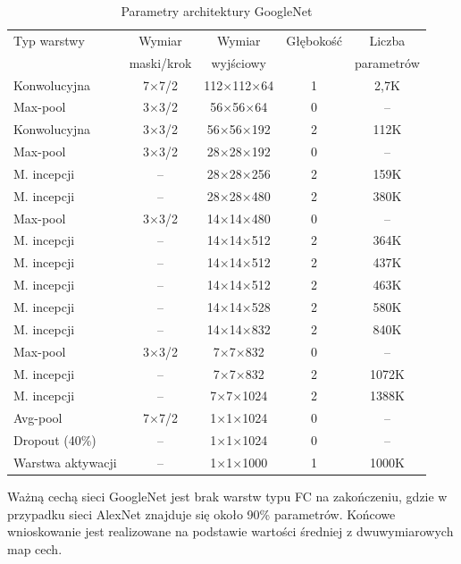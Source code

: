 \begin{table}[h!]
	\setlength{\tabcolsep}{14pt}
	\centering
	\caption{Parametry architektury GoogleNet}
	\scriptsize
	\label{tab:USG-params}
	\begin{tabular}{l | c | c | c | c }
		Typ warstwy  & Wymiar  & Wymiar & Głębokość & Liczba   \\  
		& maski/krok & wyjściowy &&parametrów\\
	    \hline \hline
		Konwolucyjna   & 7$\times$7/2 & 112$\times$112$\times$64 & 1 & 2,7K \\ \hline
		Max-pool & 3$\times$3/2 & 56$\times$56$\times$64 & 0 & --  \\ \hline
		Konwolucyjna & 3$\times$3/2 & 56$\times$56$\times$192 & 2 & 112K  \\ \hline
		Max-pool & 3$\times$3/2 & 28$\times$28$\times$192 & 0 & --  \\ \hline
		M. incepcji & -- & 28$\times$28$\times$256 & 2 & 159K  \\ \hline
		M. incepcji & -- & 28$\times$28$\times$480 & 2 & 380K  \\ \hline
		Max-pool & 3$\times$3/2 & 14$\times$14$\times$480 & 0 & --  \\ \hline
		M. incepcji & -- & 14$\times$14$\times$512 & 2 & 364K  \\ \hline
		M. incepcji & -- & 14$\times$14$\times$512 & 2 & 437K  \\ \hline
		M. incepcji & -- & 14$\times$14$\times$512 & 2 & 463K  \\ \hline
		M. incepcji & -- & 14$\times$14$\times$528 & 2 & 580K  \\ \hline
		M. incepcji & -- & 14$\times$14$\times$832 & 2 & 840K  \\ \hline
		Max-pool & 3$\times$3/2 & 7$\times$7$\times$832 & 0 & --  \\ \hline
		M. incepcji & -- & 7$\times$7$\times$832 & 2 & 1072K  \\ \hline
		M. incepcji & -- & 7$\times$7$\times$1024 & 2 & 1388K  \\ \hline
		Avg-pool & 7$\times$7/2 & 1$\times$1$\times$1024 & 0 & --  \\ \hline
		Dropout (40\%) & -- & 1$\times$1$\times$1024 & 0 & --  \\ \hline
		Warstwa aktywacji & -- & 1$\times$1$\times$1000 & 1 & 1000K  \\ \hline
	\end{tabular}
	\label{GoogleNetParams}
\end{table}
\renewcommand{\arraystretch}{1}
Ważną cechą sieci GoogleNet jest brak warstw typu FC na zakończeniu, gdzie w przypadku sieci AlexNet znajduje się około 90\% parametrów. Końcowe wnioskowanie jest realizowane na podstawie wartości średniej z dwuwymiarowych map cech.


